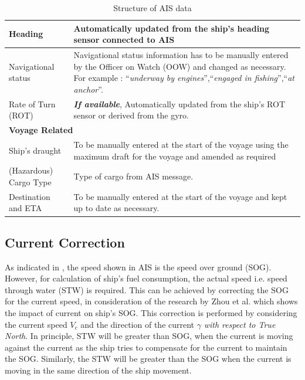 \begin{table}
{\begin{tabular}{ |p{6cm}|p{9cm}|  }
    \hline
    Heading & Automatically updated from the ship's heading sensor connected to AIS\\
    \hline
    Navigational status & Navigational status information has to be manually entered by the Officer on Watch (OOW) and changed as necessary. For example : ``\emph{underway by engines}'',``\emph{engaged in fishing}'',``\emph{at anchor}''.\\
    \hline
    Rate of Turn (ROT) & \emph{\textbf{If available}}, Automatically updated from the ship's ROT sensor or derived from
    the gyro.\\
    \hline
    \multicolumn{2}{|l|}{\textbf{Voyage Related}}\\
    \hline
    Ship's draught & To be manually entered at the start of the voyage using the
    maximum draft for the voyage and amended as required \\
    \hline 
    (Hazardous) Cargo Type & Type of cargo from AIS message.\\
    \hline
    Destination and ETA & To be manually entered at the start of the voyage and kept up to
    date as necessary.\\
    \hline
    \end{tabular}}
\caption{Structure of AIS data \citep{webimo.2014}}\label{tbl:AIS_struct}
\end{table}

\subsection{Current Correction}\label{sec:curr_corr}

As indicated in , the speed shown in AIS is the speed over ground (SOG). However, for calculation of ship's fuel consumption, the actual speed i.e. speed through water (STW) is required. This can be achieved by correcting the SOG for the current speed, in consideration of the research by Zhou et al. \citep{Zhou.2017} which shows the impact of current on ship's SOG. This correction is performed by considering the current speed $V_c$ and the direction of the current $\gamma$ \emph{with respect to True North}. In principle, STW will be greater than SOG, when the current is moving against the current as the ship tries to compensate for the current to maintain the SOG. Similarly, the STW will be greater than the SOG when the current is moving in the same direction of the ship movement. \\

